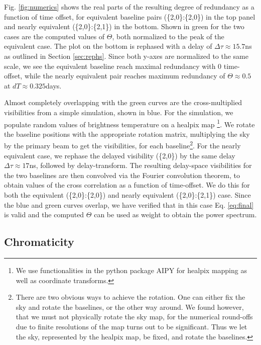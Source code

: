 \documentclass[twocolumn,apj,numberedappendix]{emulateapj}
\renewcommand\[{\begin{equation}}
\renewcommand\]{\end{equation}}
\begin{document}
Fig. \ref{fig:numerics} shows the real parts of the resulting degree of redundancy as a function of time offset, for equivalent baseline pairs (\{2,0\}:\{2,0\}) in the top panel and nearly equivalent (\{2,0\}:\{2,1\}) in the bottom. Shown in green for the two cases are the computed values of $\Theta$, both normalized to the peak of the equivalent case. The plot on the bottom is rephased with a delay of $\Delta\tau\approx15.7$ns as outlined in Section \ref{sec:rephs}. Since both y-axes are normalized to the same scale, we see the equivalent baseline reach maximal redundancy with 0 time-offset, while the nearly equivalent pair reaches maximum redundancy of $\Theta\approx0.5$ at $dT\approx0.325$days. 

Almost completely overlapping with the green curves are the cross-multiplied visibilities from a simple simulation, shown in blue. For the simulation, we populate random values of brightness temperature
on a healpix map \citep{Heal, HealPrimer} \footnote{We use functionalities in the python package AIPY for healpix mapping
as well as coordinate transforms. }. We rotate the baseline positions with
the appropriate rotation matrix, multiplying the sky by the primary beam to get the visibilities, for each
baseline\footnote{There are two obvious ways to achieve the rotation. One
can either fix the sky and rotate the baselines, or the other way
around. We found however, that we must not physically rotate the sky
map, for the numerical round-offs due to finite resolutions of the
map turns out to be significant. Thus we let the sky, represented
by the healpix map, be fixed, and rotate the baselines. }. For the nearly equivalent case, we rephase the delayed visibility (\{2,0\}) by the same delay $\Delta\tau\approx17$ns, followed by delay-transform. The resulting delay-space visibilities for the two baselines are then convolved
via the Fourier convolution theorem, to obtain values of the cross
correlation as a function of time-offset.   We do this for both the equivalent (\{2,0\}:\{2,0\}) and nearly equivalent (\{2,0\}:\{2,1\}) case.
Since the blue and green curves overlap, we have verified that in this case Eq. \eqref{eq:final} is valid and the computed $\Theta$ can be used as weight to obtain the power spectrum. 


\subsection{Chromaticity \label{sec:chromaticity}}
\end{document}
